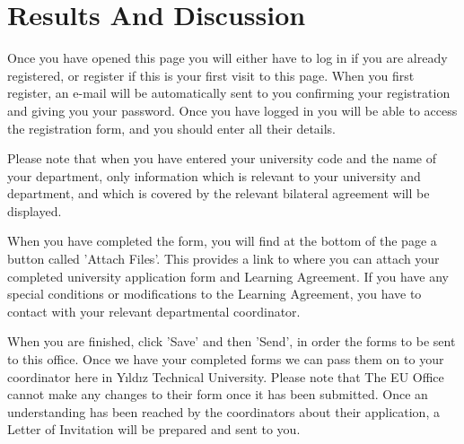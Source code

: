 \chapter{Results And Discussion}

Once you have opened this page you will either have to log in if you are already registered, or register if this is your first visit to this page. When you first register, an e-mail will be automatically sent to you confirming your registration and giving you your password. Once you have logged in you will be able to access the registration form, and you should enter all their details.

Please note that when you have entered your university code and the name of your department, only information which is relevant to your university and department, and which is covered by the relevant bilateral agreement will be displayed.

When you have completed the form, you will find at the bottom of the page a button called 'Attach Files'. This provides a link to where you can attach your completed university application form and Learning Agreement. If you have any special conditions or modifications to the Learning Agreement, you have to contact with your relevant departmental coordinator.

When you are finished, click 'Save' and then 'Send', in order the forms to be sent to this office. Once we have your completed forms we can pass them on to your coordinator here in Yıldız Technical University. Please note that The EU Office cannot make any changes to their form once it has been submitted. Once an understanding has been reached by the coordinators about their application, a Letter of Invitation will be prepared and sent to you.
